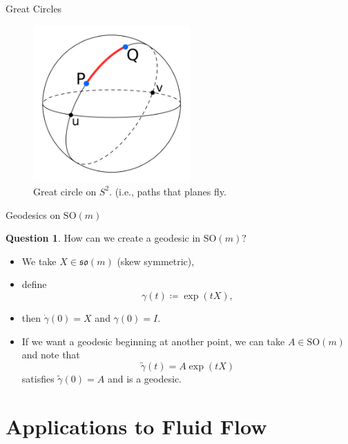 \documentclass[usenames,dvipsnames]{beamer}
\theoremstyle{definition}
\newtheorem*{question}{Question}
\theoremstyle{theorem}
\begin{document}
    \begin{frame}{Great Circles}
        \begin{figure}
            \centering
            \includegraphics[width=6cm]{Topological_Hydrodynamics/great_circle.png}
            \caption{Great circle on $S^2$. (i.e., paths that planes fly.}
            \label{fig:my_label}
        \end{figure}
    \end{frame}
    
    \begin{frame}{Geodesics on $\textrm{SO}(m)$}
        \begin{question}
        How can we create a geodesic in $\mathrm{SO}(m)?$
        \end{question}
        \begin{itemize}
            \item We take $X\in \mathfrak{so}(m)$ (skew symmetric),
            \item define 
            \[
            \gamma(t)\coloneqq \exp (tX),
            \]
            \item then $\dot{\gamma}(0) = X$ and $\gamma(0)=I$.
            \item If we want a geodesic beginning at another point, we can take $A\in \mathrm{SO}(m)$ and note that
            \[
            \tilde{\gamma}(t)=A\exp(tX)
            \]
            satisfies $\tilde{\gamma}(0)=A$ and is a geodesic.
        \end{itemize}
    \end{frame}

\section{Applications to Fluid Flow}
    
\end{document}
